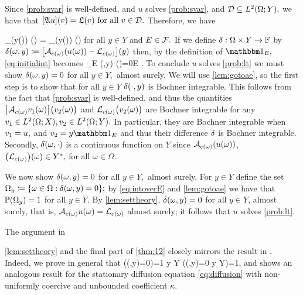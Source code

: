   

Since \cref{prob:svar} is well-defined, and $u$ solves \cref{prob:svar}, and $\D \subseteq \LtOY,$ we have that $\mleft[\SA u\mright](v) = \SL(v) \tforall v \in \D.$ Therefore, we have

\beq\label{eq:initialint}
\int_\Omega {}\mleft(y(\omega)\mright) \dd\PP(\omega) = \int_\Omega \mleft[\Lcomega\mright]\mleft(y(\omega)\mright) \dd\PP(\omega)
\eeq
for all $y \in Y$ and $E \in \mathcal F.$ If we define $\delta:\Omega\times Y \rightarrow \mathbb F$ by $\diff(\omega,y) \de \mleft[\Acomega\mleft(u(\omega)\mright) - \Lcomega\mright]\mleft(y\mright)$ then, by the definition of $\Ind{E},$ \eqref{eq:initialint} becomes
\beq\label{eq:intoverE}
\int_E \diff(\omega,y) \dd\PP(\omega)=0\quad \tforall E \in \cF.
\eeq
 To conclude $u$ solves \cref{prob:lt} we must show $\delta(\omega,y)=0$ for all $y \in Y,$ almost surely. We will use \cref{lem:gotoae}, so the first step is to show that for all $y \in Y$ $\delta(\cdot,y)$ is Bochner integrable. This follows from the fact that \cref{prob:svar} is well-defined, and thus the quantities $\big[\Acomega \vo(\omega)\big]\big(\vt(\omega)\big)$ and $\Lcomega\big(\vt(\omega)\big)$ are Bochner integrable for any $\vo\in \LtOX,\vt \in \LtOY.$ In particular, they are Bochner integrable when $v_{1}=u,$ and $\vt=y\Ind{E}$ and thus their difference $\delta$ is Bochner integrable. Secondly, $\delta(\omega,\cdot)$ is a continuous function on $Y$ since $\Acomega\mleft(u(\omega)\mright)$, $\mleft(\Lcomega\mright)(\omega) \in \Ys,$ for all $\omega \in \Omega.$

We now show $\delta(\omega,y)=0$ for all $y \in Y,$ almost surely. For $y \in Y$ define the set $\Omegay \de \set{\omega \in \Omega \st \diff(\omega,y)=0};$ by \eqref{eq:intoverE} and \cref{lem:gotoae} we have that $\mathbb P(\Omega_{y})=1$ for all $y \in Y.$ By \cref{lem:settheory}, $  \delta(\omega,y)=0$ for all $y \in Y$, almost surely, that is, $\Acomega u(\omega) = \Lcomega$ almost surely; it follows that $u$ solves \cref{prob:lt}.
\epf

The argument in 

\noindent \cref{lem:settheory} and the final part of \cref{thm:12} closely mirrors the result in \cite[Remark 2.2]{MuSt:11}. Indeed, we prove in general that
\beqs
\PP\big(\diff(\omega,y)=0\big)=1 y \in Y \quad{} \quad\PP\big(\diff(\omega,y)=0 y \in Y\big)=1,
\eeqs
and \cite[Remark 2.2]{MuSt:11} shows an analogous result for the stationary diffusion equation \eqref{eq:diffusion} with non-uniformly coercive and unbounded coefficient $\kappa.$
\ere

